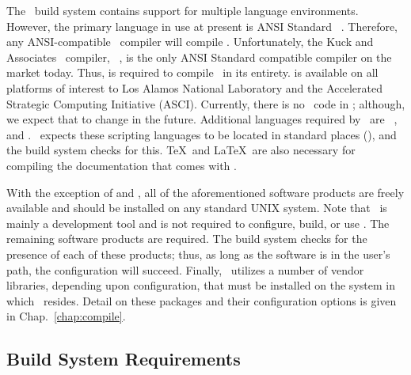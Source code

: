 The \draco\ build system contains support for multiple language
environments.  However, the primary language in use at present is ANSI
Standard \cpp~\cite{ansi:cpp}.  Therefore, any ANSI-compatible \cpp\ 
compiler will compile \draco.  Unfortunately, the Kuck and Associates
\cpp\ compiler, ~\cite{kai}, is the only ANSI Standard
compatible compiler on the market today.  Thus,  is required
to compile \draco\ in its entirety. \soft{KCC} is available on all
platforms of interest to Los Alamos National Laboratory and the
Accelerated Strategic Computing Initiative (ASCI).  Currently, there
is no \fortran\ code in \draco; although, we expect that to change in
the future.  Additional languages required by \draco\ are \python\,
\lang{PERL}, and \lang{Tcl/TK}.  \draco\ expects these scripting
languages to be located in standard places (\comp{/usr/local}), and
the build system checks for this.  \TeX\ and \LaTeX\ are also
necessary for compiling the documentation that comes with \draco.

With the exception of  and \purify, all of the
aforementioned software products are freely available and should be
installed on any standard UNIX system.  Note that \purify\ is mainly a
development tool and is not required to configure, build, or use
\draco.  The remaining software products are required.  The build
system checks for the presence of each of these products; thus, as
long as the software is in the user's path, the configuration will
succeed.  Finally, \draco\ utilizes a number of vendor libraries,
depending upon configuration, that must be installed on the system in
which \draco\ resides.  Detail on these packages and their
configuration options is given in Chap.~\ref{chap:compile}.

\subsection{Build System Requirements}
\label{sec:build_sys_req}

